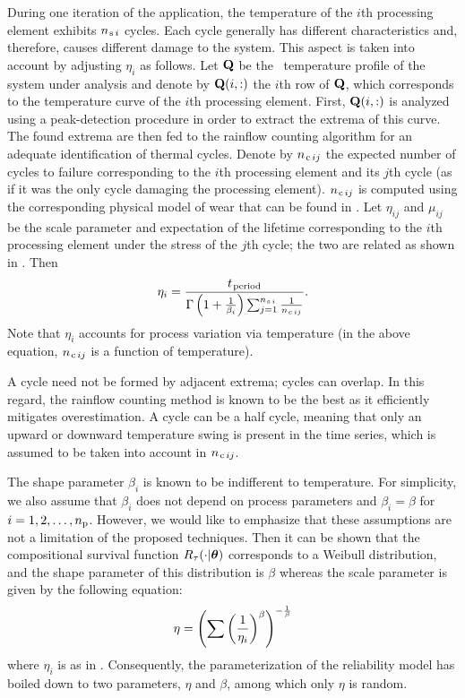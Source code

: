 During one iteration of the application, the temperature of the $i$th processing element exhibits $\nsegments[i]$ cycles.
Each cycle generally has different characteristics and, therefore, causes different damage to the system.
This aspect is taken into account by adjusting $\eta_i$ as follows.
Let $\mQ$ be the \DSS\ temperature profile of the system under analysis and denote by $\mQ(i, :)$ the $i$th row of $\mQ$, which corresponds to the temperature curve of the $i$th processing element.
First, $\mQ(i, :)$ is analyzed using a peak-detection procedure in order to extract the extrema of this curve.
The found extrema are then fed to the rainflow counting algorithm \cite{xiang2010} for an adequate identification of thermal cycles.
Denote by $\ncycles[ij]$ the expected number of cycles to failure corresponding to the $i$th processing element and its $j$th cycle (as if it was the only cycle damaging the processing element).
$\ncycles[ij]$ is computed using the corresponding physical model of wear that can be found in \cite{ukhov2012, jedec, xiang2010}.
Let $\eta_{ij}$ and $\mu_{ij}$ be the scale parameter and expectation of the lifetime corresponding to the $i$th processing element under the stress of the $j$th cycle; the two are related as shown in .
Then \cite{ukhov2012, xiang2010}
\begin{equation} \elab{weibull-eta}
  \eta_i = \frac{\period}{\Gamma\left(1 + \frac{1}{\beta_i}\right) \sum_{j = 1}^{\nsegments[i]} \frac{1}{\ncycles[ij]}}.
\end{equation}
Note that $\eta_i$ accounts for process variation via temperature (in the above equation, $\ncycles[ij]$ is a function of temperature).

\begin{remark} 
A cycle need not be formed by adjacent extrema; cycles can overlap.
In this regard, the rainflow counting method is known to be the best as it efficiently mitigates overestimation.
A cycle can be a half cycle, meaning that only an upward or downward temperature swing is present in the time series, which is assumed to be taken into account in $\ncycles[ij]$.
\end{remark}

The shape parameter $\beta_i$ is known to be indifferent to temperature.
For simplicity, we also assume that $\beta_i$ does not depend on process parameters and $\beta_i = \beta$ for $i = 1, 2, \dotsc, \nprocs$.
However, we would like to emphasize that these assumptions are not a limitation of the proposed techniques.
Then it can be shown that the compositional survival function $\survival_\T(\cdot | \pvw)$ corresponds to a Weibull distribution, and the shape parameter of this distribution is $\beta$ whereas the scale parameter is given by the following equation:
\begin{equation} \elab{compound-weibull-eta}
  \eta = \left(\sum \left( \frac{1}{\eta_i} \right)^\beta \right)^{-\frac{1}{\beta}}
\end{equation}
where $\eta_i$ is as in .
Consequently, the parameterization of the reliability model has boiled down to two parameters, $\eta$ and $\beta$, among which only $\eta$ is random.

